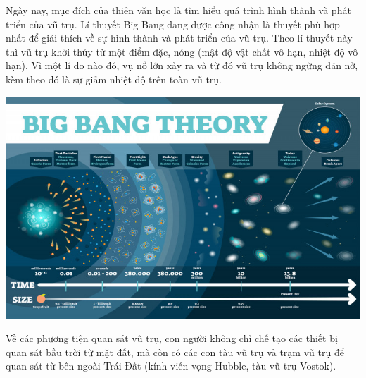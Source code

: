 Ngày nay, mục đích của thiên văn học là tìm hiểu quá trình hình thành và phát triển của vũ trụ. Lí thuyết Big Bang đang được công nhận là thuyết phù hợp nhất để giải thích về sự hình thành và phát triển của vũ trụ. Theo lí thuyết này thì vũ trụ khởi thủy từ một điểm đặc, nóng (mật độ vật chất vô hạn, nhiệt độ vô hạn). Vì một lí do nào đó, vụ nổ lớn xảy ra và từ đó vũ trụ không ngừng dãn nở, kèm theo đó là sự giảm nhiệt độ trên toàn vũ trụ.
\begin{center}
	\includegraphics[scale=0.7]{../figs/G10-002-1.jpg}
\end{center}
Về các phương tiện quan sát vũ trụ, con người không chỉ chế tạo các thiết bị quan sát bầu trời từ mặt đất, mà còn có các con tàu vũ trụ và trạm vũ trụ để quan sát từ bên ngoài Trái Đất (kính viễn vọng Hubble, tàu vũ trụ Vostok).

